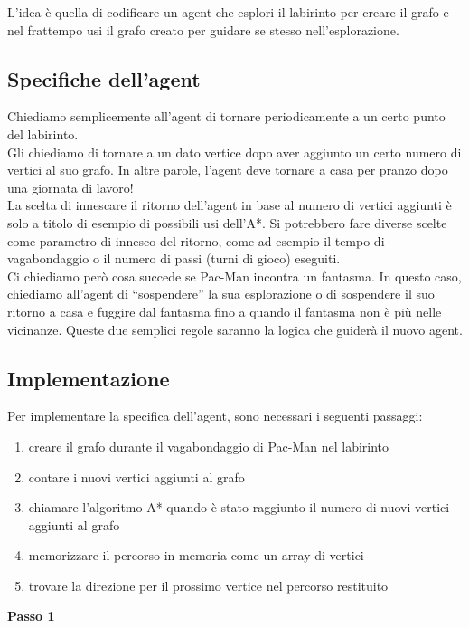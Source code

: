 \documentclass[8pt]{book}
\begin{document}
L'idea è quella di codificare un agent che esplori il labirinto per creare il grafo e nel frattempo usi il grafo creato per guidare se stesso nell'esplorazione.

\subsection{Specifiche dell'agent}

Chiediamo semplicemente all'agent di tornare periodicamente a un certo punto del labirinto.\\
Gli chiediamo di tornare a un dato vertice dopo aver aggiunto un certo numero di vertici al suo grafo. In altre parole, l'agent deve tornare a casa per pranzo dopo una giornata di lavoro!\\
La scelta di innescare il ritorno dell'agent in base al numero di vertici aggiunti è solo a titolo di esempio di possibili usi dell'A*. Si potrebbero fare diverse scelte come parametro di innesco del ritorno, come ad esempio il tempo di vagabondaggio o il numero di passi (turni di gioco) eseguiti.\\
Ci chiediamo però cosa succede se Pac-Man incontra un fantasma. In questo caso, chiediamo all'agent di ``sospendere'' la sua esplorazione o di sospendere il suo ritorno a casa e fuggire dal fantasma fino a quando il fantasma non è più nelle vicinanze. Queste due semplici regole saranno la logica che guiderà il nuovo agent.

\subsection{Implementazione}

Per implementare la specifica dell'agent, sono necessari i seguenti passaggi:

\begin{enumerate}
\item
  creare il grafo durante il vagabondaggio di Pac-Man nel labirinto
\item
  contare i nuovi vertici aggiunti al grafo
\item
  chiamare l'algoritmo A* quando è stato raggiunto il numero di nuovi vertici aggiunti al grafo
\item
  memorizzare il percorso in memoria come un array di vertici
\item
  trovare la direzione per il prossimo vertice nel percorso restituito
\end{enumerate}

\newpage
\textbf{Passo 1}
\end{document}
